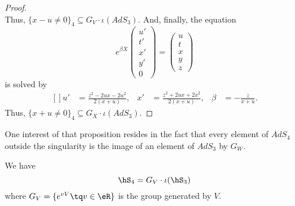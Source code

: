 \begin{proof}
\begin{equation}
\end{equation}
Thus, $\{ x-u\neq 0 \}_4\subseteq G_V\cdot\iota(AdS_3)$. And, finally, the equation
\begin{equation}
	 e^{\beta X}\begin{pmatrix}
	u'	\\ 
	t'	\\ 
	x'	\\ 
	y'	\\ 
	0	
\end{pmatrix}=
	 \begin{pmatrix}
	u	\\ 
	t	\\ 
	x	\\ 
	y	\\ 
	z	
\end{pmatrix}
\end{equation}
is solved by
\begin{equation}
	\begin{aligned}[]
		u'&=\frac{ z^2-2ux-2u^2 }{ 2(x+u) },&x'&=\frac{ z^2+2ux+2x^2 }{ 2(x+u) },&\beta&=-\frac{ z }{ x+u }.
	\end{aligned}
\end{equation}
Thus, $\{ x+u\neq 0 \}_4\subseteq G_X\cdot\iota(AdS_3)$. 

\end{proof}

One interest of that proposition resides in the fact that every element of $AdS_4$ outside the singularity is the image of an element of $AdS_3$ by $G_W$.


\begin{proposition}		\label{PropSingQTiV}
We have 
\begin{equation}
	\hS_4=G_V\cdot\iota(\hS_3)
\end{equation}
where $G_V=\{  e^{vV}\tq v\in\eR \}$ is the group generated by $V$.
\end{proposition}

